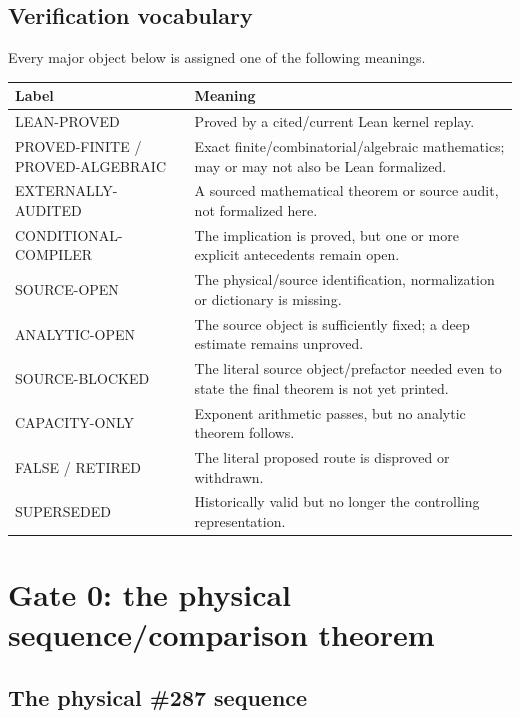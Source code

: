\documentclass[11pt]{article}
\theoremstyle{definition}
\newcommand{\1}{\mathbf 1}
\begin{document}
\subsection{Verification vocabulary}

Every major object below is assigned one of the following meanings.
\begin{center}
\renewcommand{\arraystretch}{1.16}
\begin{tabularx}{\textwidth}{>{\ttfamily\raggedright\arraybackslash}p{}X}
\toprule
Label & Meaning\\
\midrule
LEAN-PROVED & Proved by a cited/current Lean kernel replay.\\
PROVED-FINITE / PROVED-ALGEBRAIC & Exact finite/combinatorial/algebraic mathematics;
may or may not also be Lean formalized.\\
EXTERNALLY-AUDITED & A sourced mathematical theorem or source audit, not formalized here.\\
CONDITIONAL-COMPILER & The implication is proved, but one or more explicit antecedents remain open.\\
SOURCE-OPEN & The physical/source identification, normalization or dictionary is missing.\\
ANALYTIC-OPEN & The source object is sufficiently fixed; a deep estimate remains unproved.\\
SOURCE-BLOCKED & The literal source object/prefactor needed even to state the final theorem is not yet printed.\\
CAPACITY-ONLY & Exponent arithmetic passes, but no analytic theorem follows.\\
FALSE / RETIRED & The literal proposed route is disproved or withdrawn.\\
SUPERSEDED & Historically valid but no longer the controlling representation.\\
\bottomrule
\end{tabularx}
\end{center}

\section{Gate 0: the physical sequence/comparison theorem}
\label{sec:gate0-theory}

\subsection{The physical \#287 sequence}
\end{document}
